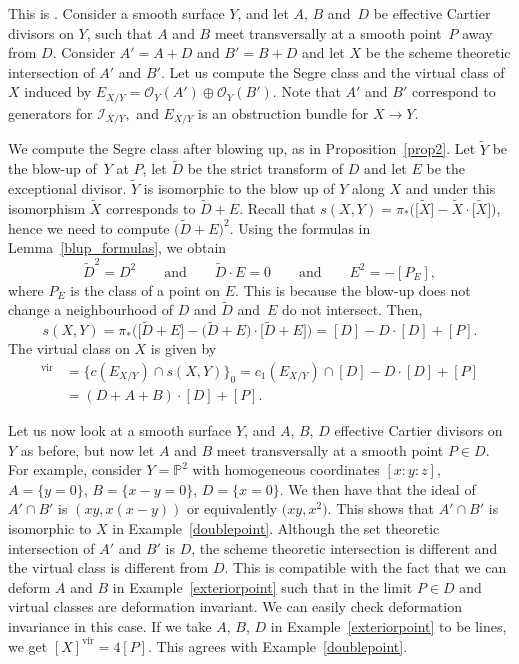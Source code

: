 \documentclass[pdftex]{sigma}
\numberwithin{equation}{section}
\newcommand{\vv}{\mathrm{vir}}
\newcommand{\PP}{\mathbb P}
\theoremstyle{plain}
\theoremstyle{definition}
\theoremstyle{remark}
\begin{document}
\begin{Example}\label{exteriorpoint}
This is \cite[Example 4.2.2]{Fulton}. Consider a smooth surface $Y$, and let $A$, $B$ and~$D$ be effective Cartier divisors on $Y$, such that $A$ and $B$ meet transversally at a smooth point~$P$ away from $D$. Consider $A'=A+D$ and $B'=B+D$ and let $X$ be the scheme theoretic intersection of $A'$ and $B'$. Let us compute the Segre class and the virtual class of~$X$ induced by $E_{X/Y}=\mathcal O_Y(A')\oplus\mathcal O_Y(B')$. Note that $A'$ and $B'$ correspond to generators for $\mathcal{I}_{X/Y},$ and $E_{X/Y}$ is an obstruction bundle for $X\to Y$.

We compute the Segre class after blowing up, as in Proposition~\ref{prop2}. Let $\tilde Y$ be the blow-up of~$Y$ at $P$, let $\tilde D$ be the strict transform of $D$ and let $E$ be the exceptional divisor. $\tilde Y$ is isomorphic to the blow up of $Y$ along $X$ and under this isomorphism $\tilde X$ corresponds to $\tilde D+E$. Recall that $s(X,Y)=\pi_*\big(\big[\tilde X\big]-\tilde X\cdot\big[\tilde X\big]\big)$, hence we need to compute $\big(\tilde D+E\big)^2$. Using the formulas in Lemma~\ref{blup_formulas}, we obtain
\begin{equation*}
 \tilde D^2=D^2 \qquad\text{and} \qquad \tilde D\cdot E=0 \qquad\text{and}\qquad E^2=-[P_E],
\end{equation*}
where $P_E$ is the class of a point on $E$. This is because the blow-up does not change a neighbourhood of $D$ and $\tilde D$ and~$E$ do not intersect. Then,
\[
 s(X,Y)=\pi_*\big(\big[\tilde D+E\big]-\big(\tilde D+E\big)\cdot\big[\tilde D+E\big]\big)=[D]-D\cdot[D]+[P].
\]
The virtual class on $X$ is given by
\begin{align*}
 [X]^\text{vir}&=\{c(E_{X/Y})\cap s(X,Y)\}_0 =c_1(E_{X/Y})\cap[D]-D\cdot[D]+[P]
 \\&=(D+A+B)\cdot[D]+[P].
\end{align*}
\end{Example}
\begin{Example}\label{example:common-divisor-specialization}Let us now look at a smooth surface $Y$, and $A$, $B$, $D$ effective Cartier divisors on $Y$ as before, but now let $A$ and $B$ meet transversally at a smooth point $P\in D$. For example, consider $Y=\PP^2$ with homogeneous coordinates $[x:y:z]$, $A=\{y=0\}$, $B=\{x-y=0\}$, $D=\{x=0\}$. We then have that the ideal of $A'\cap B'$ is $(xy, x(x-y))$ or equivalently $\big(xy, x^2\big)$. This shows that $A'\cap B'$ is isomorphic to $X$ in Example~\ref{doublepoint}. Although the set theoretic intersection of $A'$ and $B'$ is $D$, the scheme theoretic intersection is different and the virtual class is different from $D$. This is compatible with the fact that we can deform $A$ and $B$ in Example~\ref{exteriorpoint} such that in the limit $P\in D$ and virtual classes are deformation invariant. We can easily check deformation invariance in this case. If we take $A$, $B$, $D$ in Example~\ref{exteriorpoint} to be lines, we get $[X]^{\vv}= 4[P]$. This agrees with Example~\ref{doublepoint}.
\end{Example}
\end{document}
